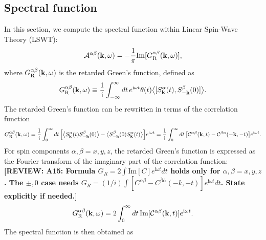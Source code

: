\documentclass[aps, prx, nofootinbib, superscriptaddress]{revtex4-2}
\newcommand{\REVIEW}[1]{{\color{reviewcolor}\bfseries [REVIEW: #1]}}
\newcommand{\kvec}{\mathbf{k}}
\newcommand{\ri}{\mathrm{i}}
\begin{document}
\subsection{Spectral function}\label{subsec: Spectral Function}

In this section, we compute the spectral function within Linear Spin-Wave Theory (LSWT):
\begin{equation}
    \mathcal{A}^{\alpha\beta}(\kvec, \omega) = - \frac{1}{\pi} \mathrm{Im} [G^{\alpha\beta}_{\rm R} (\kvec, \omega)],
\end{equation}
where $G^{\alpha\beta}_{\rm R} (\kvec, \omega)$ is the retarded Green's function, defined as
\begin{equation}
    G^{\alpha\beta}_{\rm R} (\kvec, \omega) 
    \equiv  \frac{1}{\ri} \int_{-\infty}^{\infty} dt \, e^{\ri\omega t} \theta(t) \big\langle [S_{\kvec}^{\alpha} (t), S_{-\kvec}^{\beta} (0)] \big\rangle .
\end{equation}
The retarded Green's function can be rewritten in terms of the correlation function
\begin{equation}
    G^{\alpha\beta}_{\rm R} (\kvec, \omega) 
    = \frac{1}{\ri} \int_{0}^{\infty} dt \, \Big[ \big\langle S_{\kvec}^{\alpha} (t) S_{-\kvec}^{\beta} (0) \big\rangle - \big\langle S_{-\kvec}^{\beta} (0) S_{\kvec}^{\alpha} (t) \big\rangle \Big] e^{\ri \omega t}
    = \frac{1}{\ri} \int_{0}^{\infty} dt \, \big[ \mathcal{C}^{\alpha\beta}(\kvec, t) - \mathcal{C}^{\beta\alpha}(-\kvec, -t) \big] e^{\ri \omega t}.
\end{equation}
For spin components $\alpha, \beta = x, y, z$, the retarded Green's function is expressed as the Fourier transform of the imaginary part of the correlation function:
\REVIEW{A15: Formula $G_R = 2\int \mathrm{Im}[C] e^{\ri\omega t} dt$ holds only for $\alpha,\beta=x,y,z$. The $\pm,0$ case needs $G_R = (1/i)\int [C^{\alpha\beta} - C^{\bar{\beta}\bar{\alpha}}(-k,-t)] e^{\ri\omega t} dt$. State explicitly if needed.}
\begin{equation}
    G^{\alpha\beta}_{\rm R} (\kvec, \omega) 
    = 2 \int_{0}^{\infty} dt \, \mathrm{Im} [\mathcal{C}^{\alpha\beta}(\kvec, t) ] e^{\ri \omega t}.
\end{equation}
The spectral function is then obtained as
\end{document}
